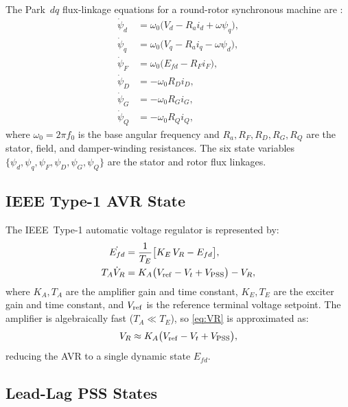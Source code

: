 \documentclass[journal]{IEEEtran}
\newcommand{\Efd}{E_{fd}}
\newcommand{\Vpss}{V_{\rm PSS}}
\newcommand{\Vt}{V_t}
\begin{document}
The Park~$dq$ flux-linkage equations for a round-rotor synchronous
machine are \cite{Kundur1994}:
\begin{align}
  \dot{\psi}_d &= \omega_0\bigl(V_d - R_a i_d + \omega\psi_q\bigr), \label{eq:psid}\\
  \dot{\psi}_q &= \omega_0\bigl(V_q - R_a i_q - \omega\psi_d\bigr), \label{eq:psiq}\\
  \dot{\psi}_F &= \omega_0\bigl(\Efd - R_F i_F\bigr),               \label{eq:psiF}\\
  \dot{\psi}_D &= -\omega_0 R_D i_D,                                  \label{eq:psiD}\\
  \dot{\psi}_G &= -\omega_0 R_G i_G,                                  \label{eq:psiG}\\
  \dot{\psi}_Q &= -\omega_0 R_Q i_Q,                                  \label{eq:psiQ}
\end{align}
where $\omega_0 = 2\pi f_0$ is the base angular frequency and
$R_a, R_F, R_D, R_G, R_Q$ are the stator, field, and damper-winding
resistances.  The six state variables
$\{\psi_d,\psi_q,\psi_F,\psi_D,\psi_G,\psi_Q\}$ are the stator and
rotor flux linkages.

\subsection{IEEE Type-1 AVR State}

The IEEE~Type-1 automatic voltage regulator
\cite{Anderson1977,IEEEStd421} is represented by:
\begin{align}
  \dot{\Efd} &= \frac{1}{T_E}\bigl[K_E\,V_{R} - \Efd\bigr],
  \label{eq:efd}\\
  T_A\dot{V}_R &= K_A\bigl(V_{\rm ref} - \Vt + \Vpss\bigr) - V_R,
  \label{eq:VR}
\end{align}
where $K_A,T_A$ are the amplifier gain and time constant,
$K_E,T_E$ are the exciter gain and time constant, and
$V_{\rm ref}$ is the reference terminal voltage setpoint.
The amplifier is algebraically fast ($T_A \ll T_E$), so
\eqref{eq:VR} is approximated as:
\begin{equation}
  V_R \approx K_A\bigl(V_{\rm ref} - \Vt + \Vpss\bigr),
  \label{eq:VR_approx}
\end{equation}
reducing the AVR to a single dynamic state $\Efd$.

\subsection{Lead-Lag PSS States}
\end{document}
